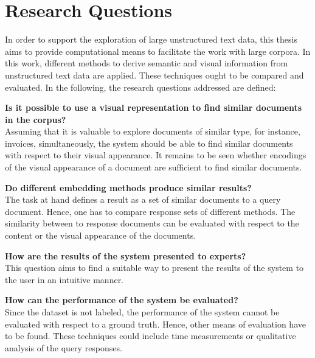 \section{Research Questions}\label{sec:research-questions}

In order to support the exploration of large unstructured text data, 
this thesis aims to provide computational means to facilitate the work with large corpora.
In this work, different methods to derive semantic and visual information from unstructured text data are applied.
These techniques ought to be compared and evaluated.
In the following, the research questions addressed are defined:
\begin{questions}%
    \item \textbf{Is it possible to use a visual representation to find similar documents in the corpus?}\label{enum:rq1} \hfill \\
    Assuming that it is valuable to explore documents of similar type, for instance, invoices, simultaneously,
    the system should be able to find similar documents with respect to their visual appearance.
    It remains to be seen whether encodings of the visual appearance of a document are sufficient to find similar documents.

    \item \textbf{Do different embedding methods produce similar results?}\label{enum:rq2} \hfill \\
    The task at hand defines a result as a set of similar documents to a query document.
    Hence, one has to compare response sets of different methods.
    The similarity between to response documents can be evaluated with respect to the content or the visual appearance of the documents. 
    
    \item \textbf{How are the results of the system presented to experts?}\label{enum:rq3} \hfill \\
    This question aims to find a suitable way to present the results of the system to the user in an intuitive manner.
    
    \item \textbf{How can the performance of the system be evaluated?}\label{enum:rq4} \hfill \\
    Since the dataset is not labeled, the performance of the system cannot be evaluated with respect to a ground truth.
    Hence, other means of evaluation have to be found.
    These techniques could include time measurements or qualitative analysis of the query responses.

\end{questions}